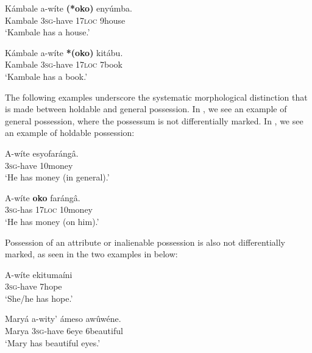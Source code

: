 \documentclass[output=paper]{langscibook}
\begin{document}
\ea \label{ex:schneider:possessionandownership}
\begin{xlist}

\ex \label{ex:schneider:ownership}
\gll Kámbale a-wíte \textbf{(*oko)} enyúmba.\\
Kambale \textsc{3sg}-have \textsc{17loc} 9house\\
\glt  `Kambale has a house.'

\ex \label{ex:schneider:possession}
\gll Kámbale a-wíte \textbf{*(oko)} kitábu.\\
Kambale \textsc{3sg}-have \textsc{17loc} 7book\\
\glt  `Kambale has a book.'

\end{xlist}
\z

The following examples underscore the systematic morphological distinction that is made between holdable and general possession. In , we see an example of general possession, where the possessum is not differentially marked. In , we see an example of holdable possession: 

\ea \label{ex:schneider:ownershipandoko}
\begin{xlist}
\ex \label{ex:schneider:ownershipnooko}
\gll A-wíte esyofarángâ.\\
\textsc{3sg}-have 10money\\
\glt  `He has money (in general).'

\ex \label{ex:schneider:possesionandoko}
\gll A-wíte \textbf{oko} farángâ.\\
\textsc{3sg}-has \textsc{17loc} 10money\\
\glt  `He has money (on him).'
\end{xlist}
\z 

Possession of an attribute or inalienable possession is also not differentially marked, as seen in the two examples in  below:

\ea \label{ex:schneider:attributeorinalienable}
\begin{xlist}

\ex \label{ex:schneider:attribute}
\gll A-wíte  ekitumaíni\\
\textsc{3sg}-have 7hope\\
\glt  `She/he has hope.'

\ex \label{ex:schneider:inalienable}
\gll Maryá a-wity' ámeso aw\^uw\'ene.\\
Marya \textsc{3sg}-have 6eye 6beautiful\\
\glt  `Mary has beautiful eyes.'

\end{xlist}
\z
\end{document}
